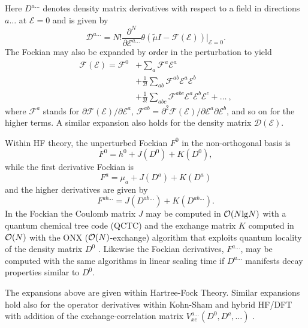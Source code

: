 \documentclass[prl,aps,twocolumn,showpacs,twocolumngrid,superbib]{revtex4}
\def\F{\mathcal{F}}
\def\D{\mathcal{D}}
\def\E{\mathcal{E}}
\begin{document}
Here $D^{a\ldots}$ denotes density matrix derivatives with respect to a field in directions $a\ldots$ 
at $\mathcal{E} = 0$ and is given by 
\begin{equation}
 \displaystyle\D^{a\ldots}=N!
 \frac{\partial^N}{\partial\E^{a\ldots}}\theta(\tilde{\mu}I-
 \F(\E))\bigg|_{\E=0} \label{DDeriv1}.
\end{equation}
 The Fockian may also be expanded by order in the perturbation to yield
\begin{equation}\label{FockianTaylor}
  \begin{split}
    \F(\E)=\F^{0} & +\sum_a \F^{a}\E^{a}\\
    &+\frac{1}{2!}\sum_{ab} \F^{ab}\E^{a}\E^{b}\\
    &+\frac{1}{3!}\sum_{abc} \F^{abc}\E^{a}\E^{b}\E^{c}+\dots ~,
  \end{split}
\end{equation}
where $\F^{a}$ stands for $\partial\F(\E)/\partial\E^{a}$,
$\F^{ab}=\partial^2\F(\E)/\partial\E^{a}\partial\E^{b}$,
and so on for the higher terms.
A similar expansion also holds for the density matrix $\D(\E)$.

Within HF theory, the unperturbed Fockian $F^0$ in the non-orthogonal 
basis is 
\begin{equation}
F^0=h^0+J(D^0)+K(D^0), 
\end{equation}
while the first derivative Fockian is 
\begin{equation}
F^a=\mu_a+J(D^a)+K(D^a)
\end{equation}
and the higher derivatives are given by 
\begin{equation}
F^{ab\ldots}=J(D^{ab\ldots})+K(D^{ab\ldots}). 
\end{equation}
In the Fockian the Coulomb matrix $J$ may be computed in ${\cal O}(N{\rm lg}N)$ 
with a quantum chemical tree code (QCTC) \cite{MChallacombe97} and the
exchange matrix $K$ computed in ${\cal O}(N)$ with the ONX (${\cal O}(N)$-exchange) algorithm 
that exploits quantum locality of the density matrix $D^0$ \cite{ESchwegler97}.
Likewise the Fockian derivatives, $F^{a\ldots}$, may be computed 
with the same algorithms in linear scaling time if 
$D^{a\ldots}$ manifests decay properties similar to $D^0$. 

The expansions above are given within Hartree-Fock Theory. 
Similar expansions hold also for the operator derivatives 
within Kohn-Sham and hybrid HF/DFT with addition of 
the exchange-correlation matrix $V_{xc}^{a\ldots}(D^0,D^a,\ldots)$ 
\cite{Lee_1994,PSalek02}.
\end{document}
